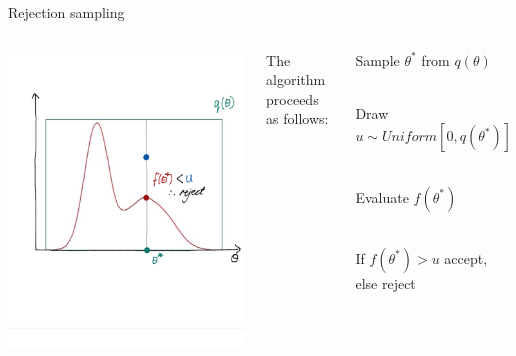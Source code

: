 \documentclass[compress]{beamer}
\begin{document}
\begin{frame}[label=sec-5-7]{Rejection sampling}
\begin{columns}[c] 
\includegraphics[width=1\linewidth]{RS6.png}

The algorithm proceeds as follows:\\
\begin{enumerate}
\item Sample $\theta^*$ from $q(\theta)$ \\~\\
\item Draw $u \sim Uniform[0, q(\theta^*)]$ \\~\\
\item Evaluate $f(\theta^*)$ \\~\\
\item If $f(\theta^*) > u$ accept, else reject \\~\\
\textcolor{white}{
\item[\color{white}] Repeat steps 1-4
}
\end{enumerate}
\end{columns}
\end{frame}
\end{document}
